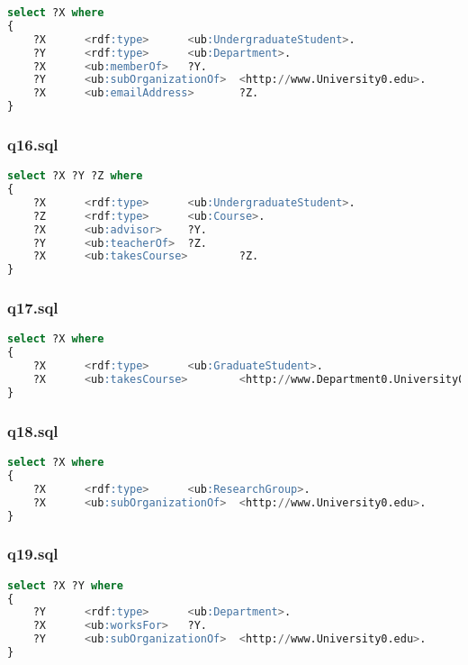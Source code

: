 \documentclass[titlepage, a4paper, 12pt] {article}
\begin{document}
\begin{lstlisting}[language=SQL]
select ?X where
{
	?X      <rdf:type>      <ub:UndergraduateStudent>.
	?Y      <rdf:type>      <ub:Department>.
	?X      <ub:memberOf>   ?Y.
	?Y      <ub:subOrganizationOf>  <http://www.University0.edu>.
	?X      <ub:emailAddress>       ?Z.
}
\end{lstlisting}

\subsubsection{q16.sql}

\begin{lstlisting}[language=SQL]
select ?X ?Y ?Z where
{
	?X      <rdf:type>      <ub:UndergraduateStudent>.
	?Z      <rdf:type>      <ub:Course>.
	?X      <ub:advisor>    ?Y.
	?Y      <ub:teacherOf>  ?Z.
	?X      <ub:takesCourse>        ?Z.
}
\end{lstlisting}

\subsubsection{q17.sql}

\begin{lstlisting}[language=SQL]
select ?X where
{
	?X      <rdf:type>      <ub:GraduateStudent>.
	?X      <ub:takesCourse>        <http://www.Department0.University0.edu/GraduateCourse0>.
}
\end{lstlisting}

\subsubsection{q18.sql}

\begin{lstlisting}[language=SQL]
select ?X where
{
	?X      <rdf:type>      <ub:ResearchGroup>.
	?X      <ub:subOrganizationOf>  <http://www.University0.edu>.
}
\end{lstlisting}

\subsubsection{q19.sql}

\begin{lstlisting}[language=SQL]
select ?X ?Y where
{
	?Y      <rdf:type>      <ub:Department>.
	?X      <ub:worksFor>   ?Y.
	?Y      <ub:subOrganizationOf>  <http://www.University0.edu>.
}
\end{lstlisting}
\end{document}

